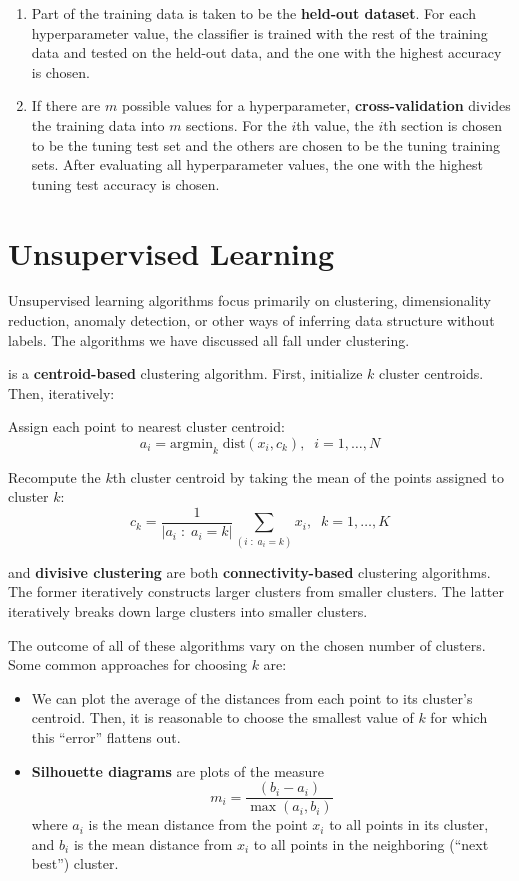 \documentclass[11pt]{article}
\begin{document}
\begin{enumerate}
    \begin{enumerate}
        \item Part of the training data is taken to be the {\bf{held-out dataset}}. For each hyperparameter value, the classifier is trained with the rest of the training data and tested on the held-out data, and the one with the highest accuracy is chosen.
        \item If there are $m$ possible values for a hyperparameter, {\bf{cross-validation}} divides the training data into $m$ sections. For the $i$th value, the $i$th section is chosen to be the tuning test set and the others are chosen to be the tuning training sets. After evaluating all hyperparameter values, the one with the highest tuning test accuracy is chosen.
    \end{enumerate}
\end{enumerate}


\section*{Unsupervised Learning}

Unsupervised learning algorithms focus primarily on clustering, dimensionality reduction, anomaly detection, or other ways of inferring data structure without labels. The algorithms we have discussed all fall under clustering.

 is a {\bf{centroid-based}} clustering algorithm. First, initialize $k$ cluster centroids. Then, iteratively:

\noindent Assign each point to nearest cluster centroid:
\[
a_i = \text{argmin}_k \; \text{dist}(x_i, c_k), \;\; i = 1, \dots, N
\]

\noindent Recompute the $k$th cluster centroid by taking the mean of the points assigned to cluster $k$:
\[
c_k = \frac{1}{|a_i \;:\; a_i = k|} \sum_{(i \;:\; a_i = k)} x_i, \;\; k = 1, \dots, K
\]


 and {\bf{divisive clustering}} are both {\bf{connectivity-based}} clustering algorithms. The former iteratively constructs larger clusters from smaller clusters. The latter iteratively breaks down large clusters into smaller clusters.

 The outcome of all of these algorithms vary on the chosen number of clusters. Some common approaches for choosing $k$ are:
\begin{itemize}
    \item We can plot the average of the distances from each point to its cluster's centroid. Then, it is reasonable to choose the smallest value of $k$ for which this ``error'' flattens out.
    \item {\bf{Silhouette diagrams}} are plots of the measure
    \[
    m_i = \frac{(b_i - a_i)}{\max(a_i, b_i)}
    \]
    where $a_i$ is the mean distance from the point $x_i$ to all points in its cluster, and $b_i$ is the mean distance from $x_i$ to all points in the neighboring (``next best'') cluster.
\end{itemize}
\end{document}
